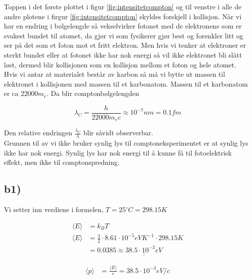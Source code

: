 \documentclass[norsk,a4paper,12pt]{article}
\begin{document}
Toppen i det første plottet i figur \ref{fig:intensitetcompton} og  til venstre i alle de andre plotene i firgur \ref{fig:intensitetcompton}  skyldes forskjell i kollisjon. Når vi har en endring i bølgelengde så vekselvirker fotonet med de elektronene som er svakest bundet til atomet, da gjør vi som fysikerer gjør best og forenkler litt og ser på det som et foton mot et fritt elektron. Men hvis vi tenker at elektroner er sterkt bundet eller at fotonet ikke har nok energi så vil ikke elektronet bli slått løst, dermed blir kollisjonen som en kollisjon mellom et foton og hele atomet. Hvis vi antar at materialet består av karbon så må vi bytte ut massen til elektronet i kollisjonen med massen til et karbonatom. Massen til et karbonatom er ca $22000m_e$. Da blir comptonbølgelengden 

\begin{equation}
\lambda_C = \frac{h}{22000m_ec} \approx 10^{-7} nm = 0.1fm
\end{equation}

Den relative endringen $\frac{\lambda_C}{\lambda}$ blir såvidt observerbar. 
\\

Grunnen til av vi ikke bruker synlig lys til comptoneksperimentet er at synlig lys ikke har nok energi. Synlig lys har nok energi til å kunne få til fotoelektrisk effekt, men ikke til comptonspredning.


\subsection*{b1)}

Vi setter inn verdiene i formelen, $T=25^\circ C = 298.15K$

\begin{align*}
\langle E \rangle &= k_BT\\
\langle E \rangle &= \frac{3}{2} \cdot 8.61 \cdot 10^{-5}  eVK^{-1} \cdot 298.15 K\\
&= 0.0385 \approx \underline{\underline{ 38.5 \cdot10^{-3} eV}}
\end{align*}


\begin{align*}
\langle p \rangle &= \frac{\langle E \rangle}{c} =  38.5 \cdot 10^{-3} eV/c
\end{align*}
\end{document}
